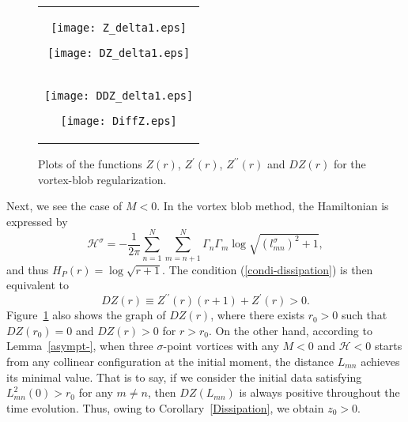 \documentclass{article}
\theoremstyle{definition}
\begin{document}
\begin{figure}[tbhp]
\begin{tabular}{c}
\begin{minipage}{0.45\hsize}
\texttt{[image: Z\_delta1.eps]}
\end{minipage}
\begin{minipage}{0.45\hsize}
\texttt{[image: DZ\_delta1.eps]}
\end{minipage}
 \\ 
\begin{minipage}{0.45\hsize}
\texttt{[image: DDZ\_delta1.eps]}
\end{minipage}
\begin{minipage}{0.45\hsize}
\texttt{[image: DiffZ.eps]}
\end{minipage}
\end{tabular}
\caption{Plots of the functions $Z(r)$, $Z^\prime(r)$, $Z^{\prime\prime}(r)$ and $DZ(r)$ for the vortex-blob regularization.}
\label{Z_delta}
\end{figure}


Next, we see the case of $M < 0$. In the vortex blob method, the Hamiltonian is expressed by
\begin{equation*}
\mathscr{H}^\sigma = - \frac{1}{2 \pi} \sum_{n=1}^N \sum_{m=n+1}^N \Gamma_n \Gamma_m \log{\sqrt{\left(l_{mn}^\sigma\right)^2 + 1}},  
\end{equation*}
and thus $H_P(r) = \log{\sqrt{r + 1}}$. The condition (\ref{condi-dissipation}) is then equivalent to
\begin{equation*}
DZ(r) \equiv Z^{\prime\prime}(r) (r + 1) + Z^\prime(r) > 0.
\end{equation*}
Figure~\ref{Z_delta} also shows the graph of $DZ(r)$, where there exists $r_0>0$ such that $DZ(r_0) = 0$ and $DZ(r) > 0$ for $r > r_0$. On the other hand, according to Lemma~\ref{asympt-}, when three $\sigma$-point vortices with any $M < 0$ and $\mathscr{H} < 0$ starts from any collinear configuration at the initial moment,  the distance $L_{mn}$ achieves its minimal value. That is to say, if we consider the initial data satisfying $L^2_{mn}(0) > r_0$ for any $m \neq n$, then $DZ(L_{mn})$ is always positive throughout the time evolution. Thus, owing to Corollary~\ref{Dissipation}, we obtain $z_0 > 0$. 
\end{document}
